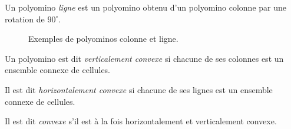  Un polyomino  \emph{ligne} est un polyomino obtenu d'un polyomino colonne par une rotation de $90^{\circ}$.
\begin{figure}[!htb]
\begin{minipage}[c]{.07\linewidth}
\centering

\end{minipage}\hfill
\begin{minipage}[c]{.37\linewidth}
\centering
\begin{minipage}[c]{.17\linewidth}
\centering
\end{minipage}\hfill
\begin{minipage}[c]{.69\linewidth}
\centering
\begin{logicpuzzle}[rows=4,columns=1,color=cyan!100, width=750px,scale=0.5]
\framepuzzle[black!50]
\end{logicpuzzle}
\end{minipage}
\end{minipage}
\hfill
\begin{minipage}[c]{.36\linewidth}
        \centering
\begin{logicpuzzle}[rows=1,columns=5,color=cyan!100, width=750px,scale=0.5]
\framepuzzle[black!50]
\end{logicpuzzle}
\end{minipage}
\hfill
\caption{\label{fign2023} Exemples de polyominos colonne et ligne. }
\end{figure}

 Un polyomino est dit \emph{verticalement convexe} si chacune de ses colonnes est un ensemble connexe de cellules.

 Il est dit \emph{ horizontalement convexe} si chacune de ses lignes est un ensemble connexe de cellules.

 Il est dit \emph{convexe} s'il est à la fois horizontalement et verticalement convexe.

